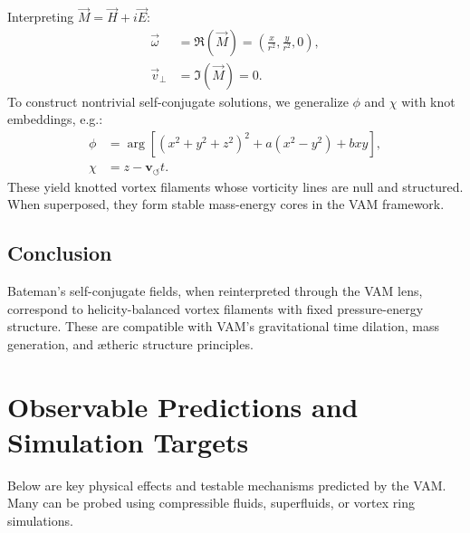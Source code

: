 \documentclass[12pt]{article}
\begin{document}
Interpreting $\vec{M} = \vec{H} + i\vec{E}$:
\begin{align*}
    \vec{\omega} &= \Re(\vec{M}) = \left(\frac{x}{r^2}, \frac{y}{r^2}, 0\right), \\
    \vec{v}_\perp &= \Im(\vec{M}) = 0.
\end{align*}
To construct nontrivial self-conjugate solutions, we generalize $\phi$ and $\chi$ with knot embeddings, e.g.:\cite{faddeev1997stable, arrayas2017knots}
\begin{align}
    \phi &= \arg[(x^2 + y^2 + z^2)^2 + a(x^2 - y^2) + bxy], \\
    \chi &= z - \mathbf{v}_{\scriptscriptstyle\boldsymbol{\circlearrowleft}} t.
\end{align}
These yield knotted vortex filaments whose vorticity lines are null and structured. When superposed, they form stable mass-energy cores in the VAM framework.

\subsection*{Conclusion}

Bateman's self-conjugate fields, when reinterpreted through the VAM lens, correspond to helicity-balanced vortex filaments with fixed pressure-energy structure. These are compatible with VAM's gravitational time dilation, mass generation, and ætheric structure principles.
\section{Observable Predictions and Simulation Targets}
Below are key physical effects and testable mechanisms predicted by the VAM. Many can be probed using compressible fluids, superfluids, or vortex ring simulations.
\end{document}

